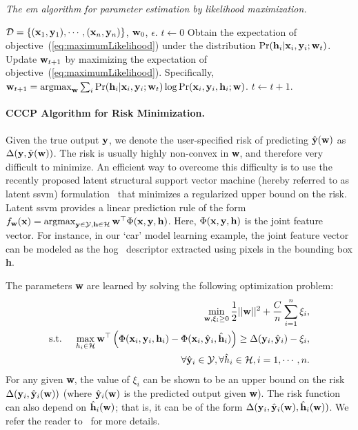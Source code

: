 \documentclass{article}
\newcommand{\myparagraph}[1]{\vspace{-2mm}\paragraph{#1}}
\newcommand{\mytopcaption}[1]{\caption{\em \footnotesize #1}}
\newcommand{\argmax}{\operatornamewithlimits{argmax}}
\begin{document}
\begin{algorithm}[h!]
\mytopcaption{The {\sc em} algorithm for parameter estimation by likelihood maximization.}
\label{algo:EM}
\begin{algorithmic}[1]
\INPUT ${\cal D} = \{({\bf x}_1,{\bf y}_1),\cdots,({\bf x}_n,{\bf y}_n)\}$, ${\bf w}_0$, $\epsilon$.
\STATE $t \leftarrow 0$
\REPEAT
\STATE Obtain the expectation of objective~(\ref{eq:maximumLikelihood}) under the distribution
$\Pr({\bf h}_i | {\bf x}_i, {\bf y}_i; {\bf w}_t)$.
\STATE Update ${\bf w}_{t+1}$ by maximizing the expectation of objective~(\ref{eq:maximumLikelihood}). Specifically, \\
${\bf w}_{t+1} = \argmax_{\bf w}\sum_i \Pr({\bf h}_i | {\bf x}_i, {\bf y}_i; {\bf w}_t)
\log \Pr({\bf x}_i, {\bf y}_i, {\bf h}_i; {\bf w})$.
\STATE $t \leftarrow t + 1$.
\end{algorithmic}
\end{algorithm}


\myparagraph{CCCP Algorithm for Risk Minimization.}

Given the true output ${\bf y}$, we denote the user-specified risk of
predicting $\hat{\bf y}({\bf w})$ as $\Delta({\bf y},\hat{\bf y}({\bf w}))$.
The risk is usually highly non-convex in {\bf w}, and therefore very difficult
to minimize. An efficient way to overcome this difficulty is to use the recently
proposed latent structural support vector machine (hereby referred to as latent
{\sc ssvm}) formulation~\cite{felzenszwalbcvpr08,yuicml09} that minimizes a
regularized upper bound on the risk. Latent {\sc ssvm} provides a
linear prediction rule of the form
$f_{\bf w}({\bf x}) = \argmax_{{\bf y} \in {\cal Y},{\bf h}\in {\cal H}} {\bf w}^\top \Phi({\bf x},{\bf y},{\bf h})$.
Here, $\Phi({\bf x},{\bf y},{\bf h})$ is the joint feature vector. For instance, in our `car' model learning example,
the joint feature vector can be modeled as the {\sc hog}~\cite{dalalcvpr05}
descriptor extracted using pixels in the bounding box {\bf h}.

The parameters {\bf w} are learned by
solving the following optimization problem:
\begin{eqnarray}
&&\min_{{\bf w},\xi_i \geq 0} \frac{1}{2}||{\bf w}||^2 + \frac{C}{n} \sum_{i=1}^n \xi_i, \nonumber \\
\mbox{s.t. } && \max_{h_i \in {\cal H}} {\bf w}^\top \left(\Phi({\bf x}_i,{\bf y}_i,{\bf h}_i) - 
		\Phi({\bf x}_i,\hat{\bf y}_i,\hat{\bf h}_i) \right)
	 \geq \Delta({\bf y}_i,\hat{\bf y}_i) - \xi_i, \nonumber \\
\label{eq:latentSSVM}
&&\forall \hat{\bf y}_i \in {\cal Y}, \forall \hat{h}_i \in {\cal H}, i=1,\cdots,n.
\end{eqnarray}
For any given {\bf w}, the value of $\xi_i$ can be shown to be an upper bound on
the risk $\Delta({\bf y}_i,\hat{{\bf y}}_i({\bf w}))$ (where $\hat{\bf y}_i({\bf w})$ is
the predicted output given {\bf w}). The risk function can also
depend on $\hat{\bf h}_i({\bf w})$; that is, it can be of the form
$\Delta({\bf y}_i,\hat{\bf y}_i({\bf w}),\hat{\bf h}_i({\bf w}))$. We refer the reader to~\cite{yuicml09} for
more details.
\end{document}
